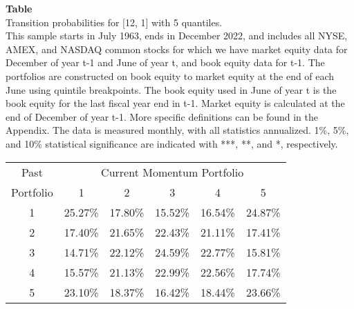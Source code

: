 \begin{table*}[ht!]
\raggedright
{}
\label{tab: transition_probs_[12, 1]_with_5_quantiles}
\textbf{Table \thetable} \\
Transition probabilities for [12, 1] with 5 quantiles. \\
\hspace*{1em}This sample starts in July 1963, ends in December 2022, and includes all NYSE, AMEX, and NASDAQ common stocks for which we have market equity data for December of year t-1 and June of year t, and book equity data for t-1. The portfolios are constructed on book equity to market equity at the end of each June using quintile breakpoints.  The book equity used in June of year t is the book equity for the last fiscal year end in t-1.  Market equity is calculated at the end of December of year t-1.  More specific definitions can be found in the Appendix.  The data is measured monthly, with all statistics annualized.  1\%, 5\%, and 10\% statistical significance are indicated with ***, **, and *, respectively. \\
\vspace{0.5em}
\centering
\begin{adjustbox}{max width=\textwidth}
\begin{tabular}{@{}cccccc@{}}
\toprule
Past & \multicolumn{5}{c}{Current Momentum Portfolio} \\
Portfolio & 1 & 2 & 3 & 4 & 5 \\
\midrule
1 & 25.27\% & 17.80\% & 15.52\% & 16.54\% & 24.87\% \\
2 & 17.40\% & 21.65\% & 22.43\% & 21.11\% & 17.41\% \\
3 & 14.71\% & 22.12\% & 24.59\% & 22.77\% & 15.81\% \\
4 & 15.57\% & 21.13\% & 22.99\% & 22.56\% & 17.74\% \\
5 & 23.10\% & 18.37\% & 16.42\% & 18.44\% & 23.66\% \\
\bottomrule
\end{tabular}
\end{adjustbox}
\end{table*}
